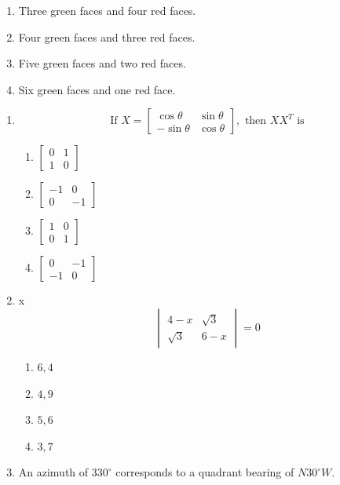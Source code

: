 \documentclass[journal,12pt,onecolumn]{IEEEtran}
\theoremstyle{remark}
\begin{document}
\begin{enumerate}
\hfill{}
\begin{multicols}{2}
\begin{enumerate}
\item Three green faces and four red faces.
\item Four green faces and three red faces.
\item Five green faces and two red faces.
\item Six green faces and one red face.
\end{enumerate}
\end{multicols}
\end{enumerate}
\begin{enumerate}
\section*{Q1 to Q25 carry one mark eac}
\item \[
\text{If } 
X = \begin{bmatrix}
\cos\theta & \sin\theta \\
-\sin\theta & \cos\theta
\end{bmatrix}, 
\text{ then } XX^{T} \text{ is}
\]
\hfill{}
\begin{enumerate}
\item $ \begin{bmatrix} 0 & 1 \\ 1 & 0 \end{bmatrix}$
\item $\begin{bmatrix} -1 & 0 \\ 0 & -1 \end{bmatrix}$
\item $\begin{bmatrix} 1 & 0 \\ 0 & 1 \end{bmatrix}$
\item $\begin{bmatrix} 0 & -1 \\ -1 & 0 \end{bmatrix}$
\end{enumerate}
\item {} x 
\[
\begin{vmatrix}
4-x & \sqrt{3} \\
\sqrt{3} & 6-x
\end{vmatrix} = 0
\]

\hfill{}
\begin{multicols}{2}
\begin{enumerate}
\item $6,4$ 
\item $4,9$
\item $5,6$
\item $3,7$
\end{enumerate}
\end{multicols}
\item An azimuth of $330^\circ$ corresponds to a quadrant bearing of $N30^\circ W$.


\end{enumerate}
\end{document}
